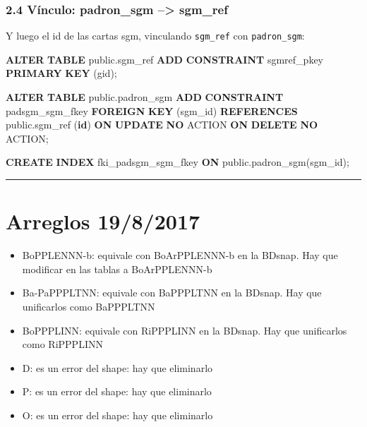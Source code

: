 \documentclass[spanish,]{article}
\newenvironment{Shaded}{}{}
\newcommand{\KeywordTok}[1]{\textcolor[rgb]{0.00,0.44,0.13}{\textbf{{#1}}}}
\newcommand{\NormalTok}[1]{{#1}}
\begin{document}
\subsubsection{2.4 Vínculo: padron\_sgm --\textgreater{}
sgm\_ref}\label{vuxednculo-padronux5fsgm-sgmux5fref}

Y luego el id de las cartas sgm, vinculando \texttt{sgm\_ref} con
\texttt{padron\_sgm}:

\begin{Shaded}
\begin{Highlighting}[]
\KeywordTok{ALTER} \KeywordTok{TABLE} \NormalTok{public.sgm_ref}
  \KeywordTok{ADD} \KeywordTok{CONSTRAINT} \NormalTok{sgmref_pkey }\KeywordTok{PRIMARY} \KeywordTok{KEY} \NormalTok{(gid);}

\KeywordTok{ALTER} \KeywordTok{TABLE} \NormalTok{public.padron_sgm}
  \KeywordTok{ADD} \KeywordTok{CONSTRAINT} \NormalTok{padsgm_sgm_fkey }\KeywordTok{FOREIGN} \KeywordTok{KEY} \NormalTok{(sgm_id) }\KeywordTok{REFERENCES}
      \NormalTok{public.sgm_ref (}\KeywordTok{id}\NormalTok{)}
   \KeywordTok{ON} \KeywordTok{UPDATE} \KeywordTok{NO} \NormalTok{ACTION }\KeywordTok{ON} \KeywordTok{DELETE} \KeywordTok{NO} \NormalTok{ACTION;}

\KeywordTok{CREATE} \KeywordTok{INDEX} \NormalTok{fki_padsgm_sgm_fkey}
    \KeywordTok{ON} \NormalTok{public.padron_sgm(sgm_id);}
\end{Highlighting}
\end{Shaded}

\begin{center}\rule{0.5\linewidth}{\linethickness}\end{center}

\section{Arreglos 19/8/2017}\label{arreglos-1982017}

\begin{itemize}
\item
  BoPPLENNN-b: equivale con BoArPPLENNN-b en la BDsnap. Hay que
  modificar en las tablas a BoArPPLENNN-b
\item
  Ba-PaPPPLTNN: equivale con BaPPPLTNN en la BDsnap. Hay que unificarlos
  como BaPPPLTNN
\item
  BoPPPLINN: equivale con RiPPPLINN en la BDsnap. Hay que unificarlos
  como RiPPPLINN
\item
  D: es un error del shape: hay que eliminarlo
\item
  P: es un error del shape: hay que eliminarlo
\item
  O: es un error del shape: hay que eliminarlo
\end{itemize}
\end{document}
